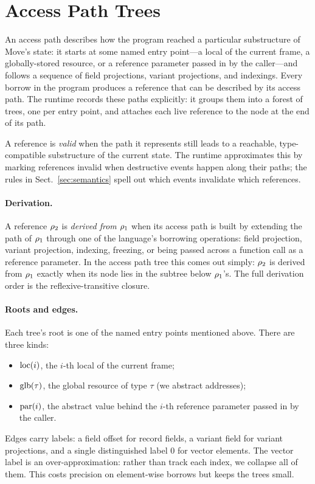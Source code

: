 \section{Access Path Trees}\label{sec:apt}

An access path describes how the program reached a particular
substructure of Move's state: it starts at some named entry
point---a local of the current frame, a globally-stored resource, or
a reference parameter passed in by the caller---and follows a
sequence of field projections, variant projections, and indexings.
Every borrow in the program produces a reference that can be
described by its access path. The runtime records these paths
explicitly: it groups them into a forest of trees, one per entry
point, and attaches each live reference to the node at the end of
its path.

A reference is \emph{valid} when the path it represents still leads
to a reachable, type-compatible substructure of the current state.
The runtime approximates this by marking references invalid when
destructive events happen along their paths; the rules in
Sect.~\ref{sec:semantics} spell out which events invalidate which
references.

\paragraph{Derivation.}
A reference $\rho_{2}$ is \emph{derived from} $\rho_{1}$ when its
access path is built by extending the path of $\rho_{1}$ through one
of the language's borrowing operations: field projection, variant
projection, indexing, freezing, or being passed across a function
call as a reference parameter. In the access path tree this comes
out simply: $\rho_{2}$ is derived from $\rho_{1}$ exactly when its
node lies in the subtree below $\rho_{1}$'s. The full derivation
order is the reflexive-transitive closure.

\paragraph{Roots and edges.}
Each tree's root is one of the named entry points mentioned above.
There are three kinds:
\begin{itemize}
\item $\mathrm{loc}(i)$, the $i$-th local of the current frame;
\item $\mathrm{glb}(\tau)$, the global resource of type $\tau$ (we abstract
addresses);
\item $\mathrm{par}(i)$, the abstract value behind the $i$-th reference
parameter passed in by the caller.
\end{itemize}
Edges carry labels: a field offset for record fields, a variant
field for variant projections, and a single distinguished label $0$
for vector elements. The vector label is an over-approximation: rather
than track each index, we collapse all of them. This costs precision
on element-wise borrows but keeps the trees small.

